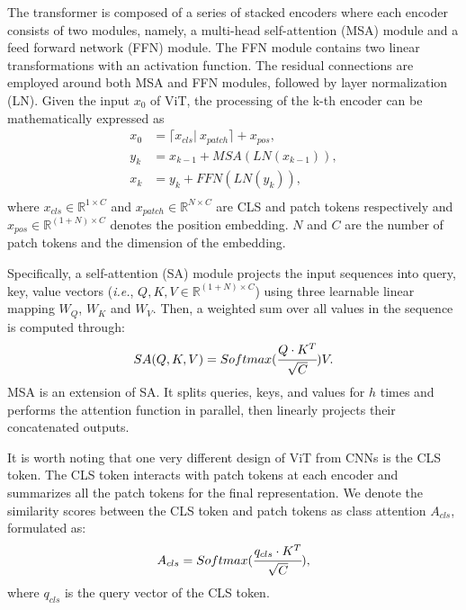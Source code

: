 \documentclass[letterpaper]{article} \usepackage{aaai22}  \usepackage{times}  \usepackage{helvet}  \usepackage{courier}  \usepackage[hyphens]{url}  \usepackage{graphicx} \urlstyle{rm} \def\UrlFont{\rm}  \usepackage{natbib}  \usepackage{caption} \DeclareCaptionStyle{ruled}{labelfont=normalfont,labelsep=colon,strut=off} \frenchspacing  \setlength{\pdfpagewidth}{8.5in}  \setlength{\pdfpageheight}{11in}  \usepackage{algorithm}
\begin{document}
The transformer is composed of a series of stacked encoders where each encoder consists of two modules, namely, a multi-head self-attention (MSA) module and a feed forward network (FFN) module. The FFN module  contains two linear transformations with an activation function. The residual connections are employed around both MSA and FFN modules, followed by layer normalization (LN).  Given the input $x_{0}$ of ViT, the processing of the k-th encoder can be mathematically expressed as
\begin{equation}
    \begin{split}
        x_{0} &= \lceil x_{cls} |\ x_{patch} \rceil + x_{pos}, \\
        y_{k} &= x_{k-1} + MSA(LN(x_{k-1})), \\
        x_{k} &= y_{k} + FFN(LN(y_{k})),\\
    \end{split}
\end{equation}
where $x_{cls}\in \mathbb{R}^{1 \times C}$ and $x_{patch}\in \mathbb{R}^{N \times C}$ are CLS and patch tokens respectively and $x_{pos}\in \mathbb{R}^{(1+N) \times C}$ denotes the position embedding. $N$ and $C$ are the number of patch tokens and the dimension of the embedding.

Specifically, a self-attention (SA) module projects the input sequences into  query, key, value vectors (\emph{i.e.}, $Q, K, V \in \mathbb{R}^{(1+N) \times C}$) using three learnable linear mapping $W_Q$, $W_K$ and $W_V$.  Then, a weighted sum over all values in the sequence is computed through:
\begin{equation}
   SA(Q,K,V)=Softmax(\cfrac{Q \cdot K^T}{\sqrt{C}}) V.
\end{equation}
MSA is an extension of SA. It splits queries, keys, and values for $h$ times and performs the attention function in parallel, then linearly projects their concatenated outputs. 

It is worth noting that one very different design of ViT from CNNs is the CLS token. The CLS token interacts with patch tokens at each encoder and summarizes all the patch tokens for the final representation. We denote the similarity scores between the CLS token and patch tokens as class attention $A_{cls}$, formulated as:
\begin{equation}
    A_{cls} = Softmax(\cfrac{q_{cls} \cdot K^T}{\sqrt{C}}),
    \label{eq:cls_attn}
\end{equation}
where $q_{cls}$ is the query vector of the CLS token. 
\end{document}
